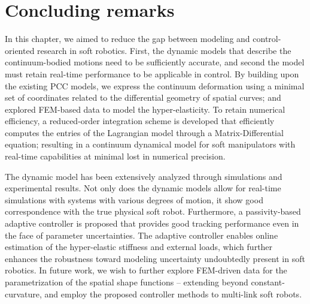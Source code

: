 \section{Concluding remarks}
\noindent In this chapter, we aimed to reduce the gap between modeling and control-oriented research in soft robotics. First, the dynamic models that describe the continuum-bodied motions need to be sufficiently accurate, and second the model must retain real-time performance to be applicable in control. By building upon the existing PCC models, we express the continuum deformation using a minimal set of coordinates related to the differential geometry of spatial curves; and explored FEM-based data to model the hyper-elasticity. To retain numerical efficiency, a reduced-order integration scheme is developed that efficiently computes the entries of the Lagrangian model through a Matrix-Differential equation; resulting in a continuum dynamical model for soft manipulators with real-time capabilities at minimal lost in numerical precision. 

The dynamic model has been extensively \editl analyzed \editr through simulations and experimental results. Not only does the dynamic models allow for real-time simulations with systems with various degrees of motion, it show good correspondence with the true physical soft robot. Furthermore, a passivity-based adaptive controller is proposed that provides good tracking performance even in the face of parameter uncertainties. The adaptive controller enables online estimation of the hyper-elastic stiffness and external loads, which further enhances the robustness toward modeling uncertainty undoubtedly present in soft robotics. In future work, we wish to further explore FEM-driven data for the parametrization of the spatial shape functions -- extending beyond constant-curvature, and employ the proposed controller methods to multi-link soft robots.
